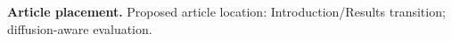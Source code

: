 \textbf{Article placement.} Proposed article location: Introduction/Results transition; diffusion-aware evaluation.
